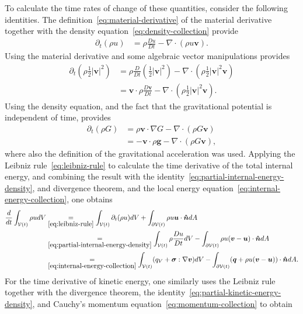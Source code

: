 To calculate the time rates of change of these quantities, consider the following identities. The definition~\eqref{eq:material-derivative} of the material derivative together with the density equation~\eqref{eq:density-collection} provide
\begin{align}\label{eq:partial-internal-energy-density}
    \partial_t(\rho u)&=\rho\frac{Du}{Dt}-\nabla\cdot(\rho u\bm{v}).
\end{align}
Using the material derivative and some algebraic vector manipulations provides
\begin{align}\label{eq:partial-kinetic-energy-density}
    \partial_t\left(\rho\frac{1}{2}|\bm{v}|^2\right)&=\rho\frac{D}{Dt}\left(\frac{1}{2}|\bm{v}|^2\right)-\nabla\cdot\left(\rho\frac{1}{2}|\bm{v}|^2\bm{v}\right)\nonumber\\
    &=\bm{v}\cdot\rho\frac{D\bm{v}}{Dt}-\nabla\cdot\left(\rho\frac{1}{2}|\bm{v}|^2\bm{v}\right).
\end{align}
Using the density equation, and the fact that the gravitational potential is independent of time, provides
\begin{align}\label{eq:partial-potential-energy-density}
    \partial_t(\rho G)&=\rho\bm{v}\cdot\nabla G-\nabla\cdot(\rho G\bm{v})\nonumber\\
    &=-\bm{v}\cdot\rho\bm{g}-\nabla\cdot(\rho G\bm{v}),
\end{align}
where also the definition of the gravitational acceleration was used. Applying the Leibniz rule~\eqref{eq:leibniz-rule} to calculate the time derivative of the total internal energy, and combining the result with the identity~\eqref{eq:partial-internal-energy-density}, and divergence theorem, and the local energy equation~\eqref{eq:internal-energy-collection}, one obtains
\begin{align}
    \frac{d}{dt}\int_{\mathcal{V}(t)}\rho udV&\underset{\eqref{eq:leibniz-rule}}{=}\int_{\mathcal{V}(t)}\partial_t(\rho u)dV+\int_{\partial\mathcal{V}(t)}\rho u\bm{u}\cdot\bm{\hat{n}}dA\nonumber\\
    &\underset{\eqref{eq:partial-internal-energy-density}}{=}\int_{\mathcal{V}(t)}\rho\frac{Du}{Dt}dV-\int_{\partial\mathcal{V}(t)}\rho u(\bm{v}-\bm{u})\cdot\bm{\hat{n}}dA\nonumber\\
    &\underset{\eqref{eq:internal-energy-collection}}{=}\int_{\mathcal{V}(t)}(q_V+\bm{\sigma}:\nabla\bm{v})dV-\int_{\partial\mathcal{V}(t)}(\bm{q}+\rho u(\bm{v}-\bm{u}))\cdot\bm{\hat{n}}dA.
\end{align}
For the time derivative of kinetic energy, one similarly uses the Leibniz rule together with the divergence theorem, the identity~\eqref{eq:partial-kinetic-energy-density}, and Cauchy's momentum equation~\eqref{eq:momentum-collection} to obtain
